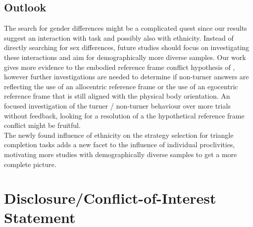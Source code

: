 \documentclass{frontiersSCNS} %
\begin{document}
\subsection{Outlook}
The search for gender differences might be a complicated quest since our results suggest an interaction with task and possibly also with ethnicity. Instead of directly searching for sex differences, future studies should focus on investigating these interactions and aim for demographically more diverse samples.
Our work gives more evidence to the embodied reference frame conflict hypothesis of \cite{Avraamides2004}, however further investigations are needed to determine if non-turner answers are reflecting the use of an allocentric reference frame or the use of an egocentric reference frame that is still aligned with the physical body orientation. An focused investigation of the turner / non-turner behaviour over more trials without feedback, looking for a resolution of a  the hypothetical reference frame conflict might be fruitful.\\
The newly found influence of ethnicity on the strategy selection for triangle completion tasks adds a new facet to the influence of individual proclivities, motivating more studies with demographically diverse samples to get a more complete picture.

\section*{Disclosure/Conflict-of-Interest Statement}
\end{document}
